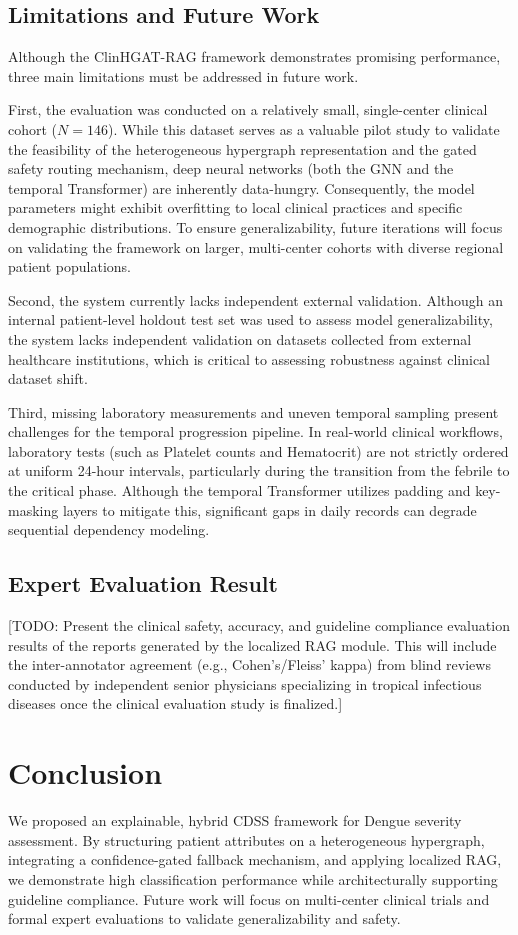 \documentclass[conference]{IEEEtran}
\begin{document}
\subsection{Limitations and Future Work}
Although the ClinHGAT-RAG framework demonstrates promising performance, three main limitations must be addressed in future work. 

First, the evaluation was conducted on a relatively small, single-center clinical cohort ($N=146$). While this dataset serves as a valuable pilot study to validate the feasibility of the heterogeneous hypergraph representation and the gated safety routing mechanism, deep neural networks (both the GNN and the temporal Transformer) are inherently data-hungry. Consequently, the model parameters might exhibit overfitting to local clinical practices and specific demographic distributions. To ensure generalizability, future iterations will focus on validating the framework on larger, multi-center cohorts with diverse regional patient populations.

Second, the system currently lacks independent external validation. Although an internal patient-level holdout test set was used to assess model generalizability, the system lacks independent validation on datasets collected from external healthcare institutions, which is critical to assessing robustness against clinical dataset shift.

Third, missing laboratory measurements and uneven temporal sampling present challenges for the temporal progression pipeline. In real-world clinical workflows, laboratory tests (such as Platelet counts and Hematocrit) are not strictly ordered at uniform 24-hour intervals, particularly during the transition from the febrile to the critical phase. Although the temporal Transformer utilizes padding and key-masking layers to mitigate this, significant gaps in daily records can degrade sequential dependency modeling.

\subsection{Expert Evaluation Result}
[TODO: Present the clinical safety, accuracy, and guideline compliance evaluation results of the reports generated by the localized RAG module. This will include the inter-annotator agreement (e.g., Cohen's/Fleiss' kappa) from blind reviews conducted by independent senior physicians specializing in tropical infectious diseases once the clinical evaluation study is finalized.]

\section{Conclusion}
\label{sec:conclusion}
We proposed an explainable, hybrid CDSS framework for Dengue severity assessment. By structuring patient attributes on a heterogeneous hypergraph, integrating a confidence-gated fallback mechanism, and applying localized RAG, we demonstrate high classification performance while architecturally supporting guideline compliance. Future work will focus on multi-center clinical trials and formal expert evaluations to validate generalizability and safety.



\end{document}
